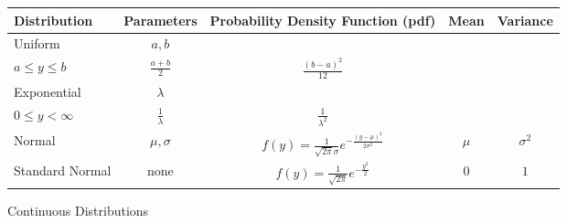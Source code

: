 \documentclass[12pt]{article}
\begin{document}
\begin{figure}[H]
\caption{Continuous Distributions}
\begin{tabular}{l c c c c}
\hline
Distribution & Parameters & Probability Density Function (pdf) & Mean & Variance \\
\hline
Uniform & $a, b$ & \makecell{ $\displaystyle f(y) = \frac{1}{b-a}$ \\ $a \leq y \leq b$ }& $\displaystyle \frac{a + b}{2}$ & $\displaystyle \frac{(b - a)^2}{12}$ \\
Exponential & $\lambda$ & \makecell{ $\displaystyle f(y) = \lambda e^{-\lambda y}$ \\ $0 \leq y < \infty$} & $\displaystyle \frac{1}{\lambda}$ & $\displaystyle \frac{1}{\lambda^2}$ \\
Normal & $\mu, \sigma$ & $\displaystyle f(y) = \frac{1}{\sqrt{2 \pi}\sigma}e^{- \frac{(y - \mu)^2}{2 \sigma^2}}$ & $\mu$ & $\sigma^2$ \\
Standard Normal & none & $\displaystyle f(y) = \frac{1}{\sqrt{2 \pi}}e^{- \frac{y^2}{2}}$ & $0$ & $1$ \\
\end{tabular}
\end{figure}
\end{document}
